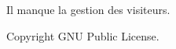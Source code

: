 
\begin{DoxyRefList}
\item[\label{bug__bug000001}%
\hypertarget{bug__bug000001}{}%
Namespace \hyperlink{namespaceUi}{Ui} ]Il manque la gestion des visiteurs. \begin{DoxyCopyright}{Copyright}
G\-N\-U Public License. 
\end{DoxyCopyright}

\end{DoxyRefList}